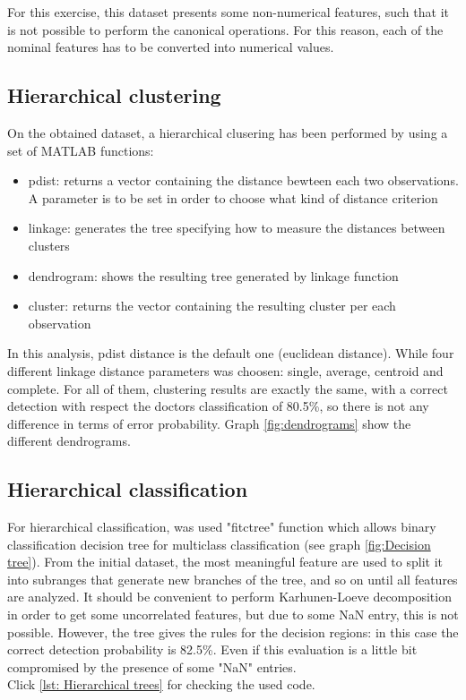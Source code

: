 \documentclass{article}
\begin{document}
For this exercise, this dataset presents some non-numerical features, such that it is not possible to perform the canonical operations. For this reason, each of the nominal features has to be converted into numerical values. 

\subsection{Hierarchical clustering}
On the obtained dataset, a hierarchical clusering has been performed by using a set of MATLAB functions:
\begin{itemize}
	\item pdist: returns a vector containing the distance bewteen each two observations. A parameter is to be set in order to choose what kind of distance criterion
	\item linkage: generates the tree specifying how to measure the distances between clusters
	\item dendrogram: shows the resulting tree generated by linkage function
	\item  cluster: returns the vector containing the resulting cluster per each observation
\end{itemize}

In this analysis, pdist distance is the default one (euclidean distance). While four different linkage distance parameters was choosen: single, average, centroid and complete. For all of them, clustering results are exactly the same, with a correct detection with respect the doctors classification of 80.5\%, so there is not any difference in terms of error probability. Graph \ref{fig:dendrograms} show the different dendrograms.

\subsection{Hierarchical classification}
For hierarchical classification, was used "fitctree" function which allows binary classification decision tree for multiclass classification (see graph \ref{fig:Decision tree}). From the initial dataset, the most meaningful feature are used to split it into subranges that generate new branches of the tree, and so on until all features are analyzed. It should be convenient to perform Karhunen-Loeve decomposition in order to get some uncorrelated features, but due to some NaN entry, this is not possible. 
However, the tree gives the rules for the decision regions: in this case the correct detection probability is 82.5\%. Even if this evaluation is a little bit compromised by the presence of some "NaN" entries. \\
Click \ref{lst: Hierarchical trees} for checking the used code.
\end{document}
